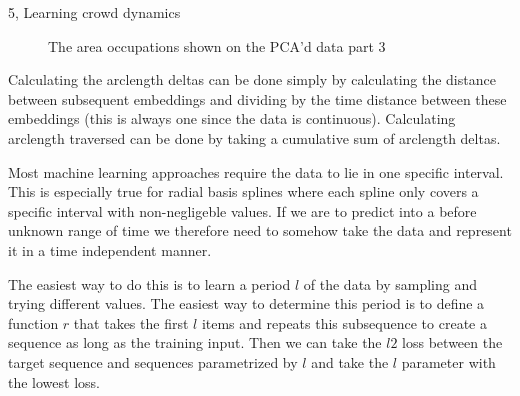 \begin{task}{5, Learning crowd dynamics}
\begin{figure}[H]
\centering
{}
\caption{The area occupations shown on the PCA'd data part 3}
\label{fig:PCAoccs3}
\end{figure}

Calculating the arclength deltas can be done simply by calculating the distance between subsequent embeddings and dividing by the time distance between these embeddings (this is always one since the data is continuous). Calculating arclength traversed can be done by taking a cumulative sum of arclength deltas.

Most machine learning approaches require the data to lie in one specific interval. This is especially true for radial basis splines where each spline only covers a specific interval with non-negligeble values. If we are to predict into a before unknown range of time we therefore need to somehow take the data and represent it in a time independent manner.

The easiest way to do this is to learn a period $l$ of the data by sampling and trying different values. The easiest way to determine this period is to define a function $r$ that takes the first $l$ items and repeats this subsequence to create a sequence as long as the training input. Then we can take the $l2$ loss between the target sequence and sequences parametrized by $l$ and take the $l$ parameter with the lowest loss.


\end{task}
